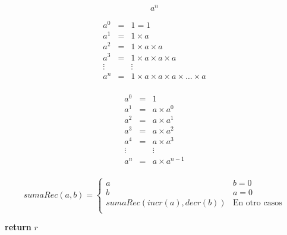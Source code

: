 \documentclass[12pt,letterpaper]{article}
\begin{document}
\[
  a^n
\]

\begin{eqnarray*}
  a^0 & = & 1 = 1 \\
  a^1 & = & 1 \times a \\
  a^2 & = & 1 \times a \times a\\
  a^3 & = & 1 \times a \times a \times a \\
  \vdots & & \vdots \\
  a^n & = & 1 \times a \times a \times a \times \ldots \times a \\
\end{eqnarray*}

\begin{eqnarray*}
  a^0 & = & 1  \\
  a^1 & = & a \times a^0   \\
  a^2 & = & a \times a^1  \\
  a^3 & = & a \times a^2 \\
  a^4 & = & a \times a^3 \\
  \vdots & & \vdots \\
  a^n & = & a \times a^{n-1} \\
\end{eqnarray*}




\[
  sumaRec(a,b) = 
  \begin{cases}
    a & b = 0\\
    b & a = 0\\
    sumaRec(incr(a),decr(b)) & \text{En otro casos} \\
  \end{cases}
\]





\begin{algorithmic}
    \EndWhile
    \State \textbf{return} $r$
    \EndFunction
\end{algorithmic}
\end{document}
